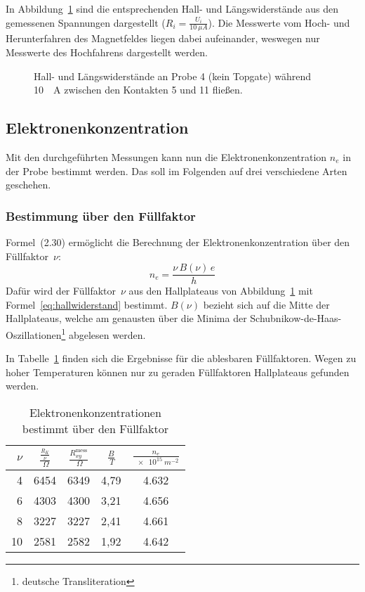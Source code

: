 \documentclass[a4paper]{article}
\begin{document}
In Abbildung~\ref{fig:magnetotransport} sind die entsprechenden Hall- und Längswiderstände
aus den gemessenen Spannungen dargestellt ($ R_i = \frac{U_i}{\SI{10}{\mu A}} $).
Die Messwerte vom Hoch- und Herunterfahren des Magnetfeldes
liegen dabei aufeinander, weswegen nur Messwerte des Hochfahrens dargestellt werden.

\begin{figure}[hb]
    
    \caption{
	Hall- und Längswiderstände an Probe 4 (kein Topgate)
	während \SI{10}{\micro{}A} zwischen den Kontakten 5 und 11 fließen.}
  \label{fig:magnetotransport}
\end{figure}


\subsection*{Elektronenkonzentration}
Mit den durchgeführten Messungen kann nun die Elektronenkonzentration $n_e$
in der Probe bestimmt werden. Das soll im Folgenden auf
drei verschiedene Arten geschehen.

\subsubsection*{Bestimmung über den Füllfaktor}
Formel~(2.30) \citet{Bockhorn}
ermöglicht die Berechnung der Elektronenkonzentration
über den Füllfaktor~$\nu$:
\begin{equation} n_e = \frac{\nu\, B(\nu)\, e}{h} \end{equation}
Dafür wird der Füllfaktor~$\nu$ aus den Hallplateaus von
Abbildung~\ref{fig:magnetotransport} mit Formel~\eqref{eq:hallwiderstand}
bestimmt.
$B(\nu)$ bezieht sich auf die Mitte der Hallplateaus,
welche am genausten über die Minima
der Schubnikow-de-Haas-Oszillationen\footnote{deutsche Transliteration}
abgelesen werden.

In Tabelle~\ref{tbl:elektronen_fuellfaktor} finden sich
die Ergebnisse für die ablesbaren Füllfaktoren.
Wegen zu hoher Temperaturen können nur zu
geraden Füllfaktoren Hallplateaus gefunden werden.

\begin{table}[h!]
\begin{center}
\begin{tabular}{rcccc}
\toprule
$\nu$ &
$\frac{\frac{R_K}{\nu}}{\SI{}{\Omega}}$ &
$\frac{R^\text{mess}_{xy}}{\SI{}{\Omega}}$ &
$\frac{B}{\SI{}{T}}$ & 
$\frac{n_e}{\SI{e15}{m^{-2}}}$ \\
\midrule
4 & 6454 & 6349 & 4,79 & \num{4.632} \\
6 & 4303 & 4300 & 3,21 & \num{4.656} \\
8 & 3227 & 3227 & 2,41 & \num{4.661} \\
10& 2581 & 2582 & 1,92 & \num{4.642} \\
\bottomrule
\end{tabular}
\end{center}
\caption{Elektronenkonzentrationen bestimmt über den Füllfaktor}
\label{tbl:elektronen_fuellfaktor}
\end{table}
\end{document}
